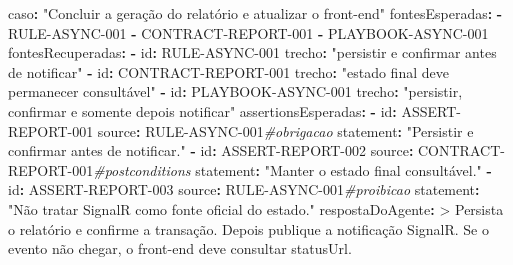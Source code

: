 \documentclass[
  10pt,
  a4paper,
  oneside]{book}
\newenvironment{Shaded}{}{}
\newcommand{\AttributeTok}[1]{\textcolor[rgb]{0.49,0.56,0.16}{#1}}
\newcommand{\CharTok}[1]{\textcolor[rgb]{0.25,0.44,0.63}{#1}}
\newcommand{\CommentTok}[1]{\textcolor[rgb]{0.38,0.63,0.69}{\textit{#1}}}
\newcommand{\FunctionTok}[1]{\textcolor[rgb]{0.02,0.16,0.49}{#1}}
\newcommand{\KeywordTok}[1]{\textcolor[rgb]{0.00,0.44,0.13}{\textbf{#1}}}
\newcommand{\NormalTok}[1]{#1}
\newcommand{\StringTok}[1]{\textcolor[rgb]{0.25,0.44,0.63}{#1}}
\begin{document}
\begin{Shaded}
\begin{Highlighting}[]
\FunctionTok{caso}\KeywordTok{:}\AttributeTok{ }\StringTok{"Concluir a geração do relatório e atualizar o front{-}end"}
\FunctionTok{fontesEsperadas}\KeywordTok{:}
\AttributeTok{  }\KeywordTok{{-}}\AttributeTok{ RULE{-}ASYNC{-}001}
\AttributeTok{  }\KeywordTok{{-}}\AttributeTok{ CONTRACT{-}REPORT{-}001}
\AttributeTok{  }\KeywordTok{{-}}\AttributeTok{ PLAYBOOK{-}ASYNC{-}001}
\FunctionTok{fontesRecuperadas}\KeywordTok{:}
\AttributeTok{  }\KeywordTok{{-}}\AttributeTok{ }\FunctionTok{id}\KeywordTok{:}\AttributeTok{ RULE{-}ASYNC{-}001}
\AttributeTok{    }\FunctionTok{trecho}\KeywordTok{:}\AttributeTok{ }\StringTok{"persistir e confirmar antes de notificar"}
\AttributeTok{  }\KeywordTok{{-}}\AttributeTok{ }\FunctionTok{id}\KeywordTok{:}\AttributeTok{ CONTRACT{-}REPORT{-}001}
\AttributeTok{    }\FunctionTok{trecho}\KeywordTok{:}\AttributeTok{ }\StringTok{"estado final deve permanecer consultável"}
\AttributeTok{  }\KeywordTok{{-}}\AttributeTok{ }\FunctionTok{id}\KeywordTok{:}\AttributeTok{ PLAYBOOK{-}ASYNC{-}001}
\AttributeTok{    }\FunctionTok{trecho}\KeywordTok{:}\AttributeTok{ }\StringTok{"persistir, confirmar e somente depois notificar"}
\FunctionTok{assertionsEsperadas}\KeywordTok{:}
\AttributeTok{  }\KeywordTok{{-}}\AttributeTok{ }\FunctionTok{id}\KeywordTok{:}\AttributeTok{ ASSERT{-}REPORT{-}001}
\AttributeTok{    }\FunctionTok{source}\KeywordTok{:}\AttributeTok{ RULE{-}ASYNC{-}001}\CommentTok{\#obrigacao}
\AttributeTok{    }\FunctionTok{statement}\KeywordTok{:}\AttributeTok{ }\StringTok{"Persistir e confirmar antes de notificar."}
\AttributeTok{  }\KeywordTok{{-}}\AttributeTok{ }\FunctionTok{id}\KeywordTok{:}\AttributeTok{ ASSERT{-}REPORT{-}002}
\AttributeTok{    }\FunctionTok{source}\KeywordTok{:}\AttributeTok{ CONTRACT{-}REPORT{-}001}\CommentTok{\#postconditions}
\AttributeTok{    }\FunctionTok{statement}\KeywordTok{:}\AttributeTok{ }\StringTok{"Manter o estado final consultável."}
\AttributeTok{  }\KeywordTok{{-}}\AttributeTok{ }\FunctionTok{id}\KeywordTok{:}\AttributeTok{ ASSERT{-}REPORT{-}003}
\AttributeTok{    }\FunctionTok{source}\KeywordTok{:}\AttributeTok{ RULE{-}ASYNC{-}001}\CommentTok{\#proibicao}
\AttributeTok{    }\FunctionTok{statement}\KeywordTok{:}\AttributeTok{ }\StringTok{"Não tratar SignalR como fonte oficial do estado."}
\FunctionTok{respostaDoAgente}\KeywordTok{: }\CharTok{\textgreater{}}
\NormalTok{  Persista o relatório e confirme a transação. Depois publique a notificação}
\NormalTok{  SignalR. Se o evento não chegar, o front{-}end deve consultar statusUrl.}

\end{Highlighting}
\end{Shaded}
\end{document}
